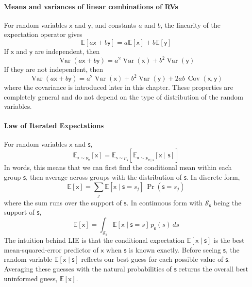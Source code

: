 \paragraph*{Means and variances of linear combinations of RVs}
For random variables $\mathsf{x}$ and $\mathsf{y}$, and constants $a$ and $b$, the linearity of the expectation operator gives
\begin{equation}
    \mathbb{E}[a\mathsf{x} + b\mathsf{y}] = a\mathbb{E}[\mathsf{x}] + b\mathbb{E}[\mathsf{y}]
\end{equation}
If $\mathsf{x}$ and $\mathsf{y}$ are independent, then 
\begin{equation}
    \operatorname{Var}(a\mathsf{x} + b\mathsf{y}) = a^2\operatorname{Var}(\mathsf{x}) + b^2\operatorname{Var}(\mathsf{y})
\end{equation}
If they are not independent, then
\begin{equation}
    \operatorname{Var}(a\mathsf{x} + b\mathsf{y}) = a^2\operatorname{Var}(\mathsf{x}) + b^2\operatorname{Var}(\mathsf{y}) + 2ab\,\operatorname{Cov}(\mathsf{x},\mathsf{y})
\end{equation}
where the covariance is introduced later in this chapter. These properties are completely general and do not depend on the type of distribution of the random variables. 

\paragraph*{Law of Iterated Expectations}
For random variables $\mathsf{x}$ and $\mathsf{s}$,
\begin{equation}
  \mathbb{E}_{\mathsf{x} \sim p_{\mathsf{x}}}[\mathsf{x}] = \mathbb{E}_{\mathsf{s} \sim p_{\mathsf{s}} }\left[\mathbb{E}_{\mathsf{x} \sim p_{\mathsf{x \mid s}}} [\mathsf{x}\mid \mathsf{s}]\right]
  \label{eq:lie}
\end{equation}
In words, this means that we can first find the conditional mean within each group $\mathsf{s}$, then average across groups with the distribution of $\mathsf{s}$. In discrete form,
\begin{equation}
  \mathbb{E}[\mathsf{x}]=\sum_j \mathbb{E}\left[\mathsf{x}\mid \mathsf{s}=s_j\right]\,\Pr(\mathsf{s}=s_j)
\end{equation}
where the sum runs over the support of $\mathsf{s}$. In continuous form with $\mathcal{S}_\mathsf{s}$ being the support of $\mathsf{s}$,
\begin{equation}
  \mathbb{E}[\mathsf{x}]=\int_{\mathcal{S}_\mathsf{s}} \mathbb{E}\left[\mathsf{x}\mid \mathsf{s}=s\right]\,p_{\mathsf{s}}(s)\,ds
\end{equation}
The intuition behind LIE is that the conditional expectation $\mathbb{E}[\mathsf{x}\mid \mathsf{s}]$ is the best mean-squared-error predictor of $\mathsf{x}$ when $\mathsf{s}$ is known exactly. Before seeing $\mathsf{s}$, the random variable $\mathbb{E}[\mathsf{x}\mid \mathsf{s}]$ reflects our best guess for each possible value of $\mathsf{s}$. Averaging these guesses with the natural probabilities of $\mathsf{s}$ returns the overall best uninformed guess, $\mathbb{E}[\mathsf{x}]$.

